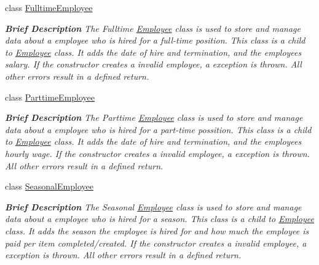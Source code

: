 \begin{DoxyCompactItemize}
class \hyperlink{class_all_employees_1_1_fulltime_employee}{Fulltime\+Employee}
\begin{DoxyCompactList}\small\item\em {\bfseries Brief Description} The Fulltime \hyperlink{class_all_employees_1_1_employee}{Employee} class is used to store and manage data about a employee who is hired for a full-\/time position. This class is a child to \hyperlink{class_all_employees_1_1_employee}{Employee} class. It adds the date of hire and termination, and the employees salary. If the constructor creates a invalid employee, a exception is thrown. All other errors result in a defined return. \end{DoxyCompactList}\item 
class \hyperlink{class_all_employees_1_1_parttime_employee}{Parttime\+Employee}
\begin{DoxyCompactList}\small\item\em {\bfseries Brief Description} The Parttime \hyperlink{class_all_employees_1_1_employee}{Employee} class is used to store and manage data about a employee who is hired for a part-\/time possition. This class is a child to \hyperlink{class_all_employees_1_1_employee}{Employee} class. It adds the date of hire and termination, and the employees hourly wage. If the constructor creates a invalid employee, a exception is thrown. All other errors result in a defined return. \end{DoxyCompactList}\item 
class \hyperlink{class_all_employees_1_1_seasonal_employee}{Seasonal\+Employee}
\begin{DoxyCompactList}\small\item\em {\bfseries Brief Description} The Seasonal \hyperlink{class_all_employees_1_1_employee}{Employee} class is used to store and manage data about a employee who is hired for a season. This class is a child to \hyperlink{class_all_employees_1_1_employee}{Employee} class. It adds the season the employee is hired for and how much the employee is paid per item completed/created. If the constructor creates a invalid employee, a exception is thrown. All other errors result in a defined return. \end{DoxyCompactList}\end{DoxyCompactItemize}
